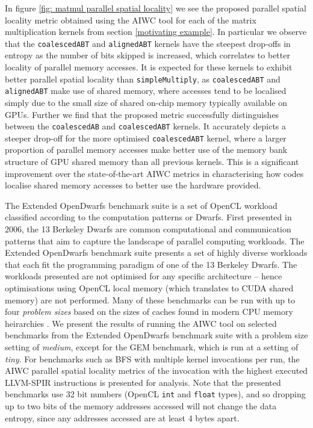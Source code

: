 \documentclass[review=false, sigchi]{acmart}
\begin{document}
	In figure \ref{fig: matmul parallel spatial locality} we see the proposed parallel spatial locality metric obtained using the AIWC tool for each of the matrix multiplication kernels from section \ref{motivating example}. In particular we observe that the \texttt{coalescedABT} and \texttt{alignedABT} kernels have the steepest drop-offs in entropy as the number of bits skipped is increased, which correlates to better locality of parallel memory accesses. It is expected for these kernels to exhibit better parallel spatial locality than \texttt{simpleMultiply}, as \texttt{coalescedABT} and \texttt{alignedABT} make use of shared memory, where accesses tend to be localised simply due to the small size of shared on-chip memory typically available on GPUs. Further we find that the proposed metric successfully distinguishes between the \texttt{coalescedAB} and \texttt{coalescedABT} kernels. It accurately depicts a steeper drop-off for the more optimised \texttt{coalescedABT} kernel, where a larger proportion of parallel memory accesses make better use of the memory bank structure of GPU shared memory than all previous kernels. This is a significant improvement over the state-of-the-art AIWC metrics in characterising how codes localise shared memory accesses to better use the hardware provided.
	
	The Extended OpenDwarfs benchmark suite is a set of OpenCL workload classified according to the computation patterns or Dwarfs. 
	First presented in 2006, the 13 Berkeley Dwarfs are common computational and communication patterns that aim to capture the landscape of parallel computing workloads. 
	The Extended OpenDwarfs benchmark suite presents a set of highly diverse workloads that each fit the programming paradigm of one of the 13 Berkeley Dwarfs.
	The workloads presented are not optimised for any specific architecture -- hence optimisations using OpenCL local memory (which translates to CUDA shared memory) are not performed. 
	Many of these benchmarks can be run with up to four \emph{problem sizes} based on the sizes of caches found in modern CPU memory heirarchies \cite{johnston18opendwarfs}.
	We present the results of running the AIWC tool on selected benchmarks from the Extended OpenDwarfs benchmark suite \cite{opendwarfs2020head,johnston18opendwarfs} with a problem size setting of \emph{medium}, except for the GEM benchmark, which is run at a setting of \emph{tiny}.
	For benchmarks such as BFS with multiple kernel invocations per run, the AIWC parallel spatial locality metrics of the invocation with the highest executed LLVM-SPIR instructions is presented for analysis. Note that the presented benchmarks use 32 bit numbers (OpenCL \texttt{int} and \texttt{float} types), and so dropping up to two bits of the memory addresses accessed will not change the data entropy, since any addresses accessed are at least 4 bytes apart.
	
\end{document}
